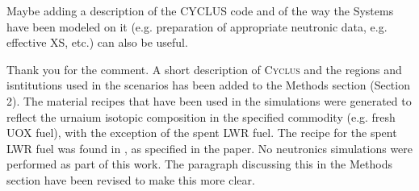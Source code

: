 \documentclass[answers,11pt]{exam}
\newcommand{\Cyclus}{\textsc{Cyclus}\xspace}%
\begin{document}
\begin{questions}
        \question Maybe adding a description of the CYCLUS code and of the way 
        the Systems have been modeled on it (e.g. preparation of appropriate 
        neutronic data, e.g. effective XS, etc.) can also be useful.
        \begin{solution}
                Thank you for the comment. A short description of \Cyclus and the 
                regions and isntitutions used in the scenarios has 
                been added to the Methods section (Section 2). 
                The material recipes that have been used 
                in the simulations were generated to reflect the urnaium isotopic 
                composition in the specified commodity (e.g. fresh UOX fuel), with 
                the exception of the spent \gls{LWR} fuel. The recipe for the spent 
                \gls{LWR} fuel 
                was found in \cite{yacout_visionverifiable_2006}, as specified in 
                the paper. No neutronics simulations were performed as part of this 
                work. The paragraph discussing this in the Methods section have been 
                revised to make this more clear. 
        \end{solution}

\end{questions}


\end{document}
